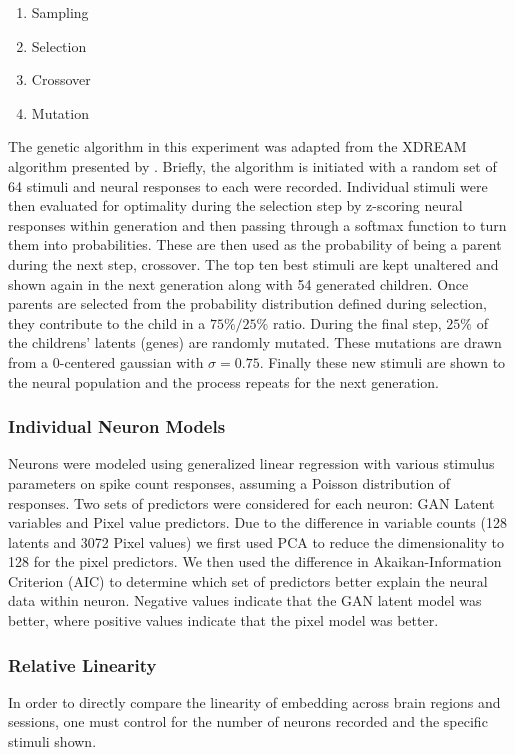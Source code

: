 \begin{enumerate}
	\item Sampling
	\item Selection
	\item Crossover
	\item Mutation
\end{enumerate}

The genetic algorithm in this experiment was adapted from the XDREAM algorithm presented by \cite{Ponce2019}. Briefly, the algorithm is initiated with a random set of 64 stimuli and neural responses to each were recorded. Individual stimuli were then evaluated for optimality during the selection step by z-scoring neural responses within generation and then passing through a softmax function to turn them into probabilities. These are then used as the probability of being a parent during the next step, crossover. The top ten best stimuli are kept unaltered and shown again in the next generation along with 54 generated children. Once parents are selected from the probability distribution defined during selection, they contribute to the child in a $75\%/25\%$ ratio. During the final step, $25\%$ of the childrens' latents (genes) are randomly mutated. These mutations are drawn from a 0-centered gaussian with $\sigma=0.75$. Finally these new stimuli are shown to the neural population and the process repeats for the next generation.

\subsubsection*{Individual Neuron Models}
Neurons were modeled using generalized linear regression with various stimulus parameters on spike count responses, assuming a Poisson distribution of responses. Two sets of predictors were considered for each neuron: GAN Latent variables and Pixel value predictors. Due to the difference in variable counts (128 latents and 3072 Pixel values) we first used PCA to reduce the dimensionality to 128 for the pixel predictors. We then used the difference in Akaikan-Information Criterion (AIC) to determine which set of predictors better explain the neural data within neuron.
Negative values indicate that the GAN latent model was better, where positive values indicate that the pixel model was better. 

\subsubsection*{Relative Linearity}
\label{methods:relativeLinearity}
In order to directly compare the linearity of embedding across brain regions and sessions, one must control for the number of neurons recorded and the specific stimuli shown.

